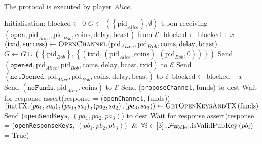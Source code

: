 \ \\  The protocol is executed by player $Alice$.
  \label{alg:lightningprot}
  \begin{algorithmic}[1]
    \State Initialisation:
    \Indent
      \State $\mathrm{blocked} \leftarrow 0$
      \State $G \leftarrow \left(\left\{\mathrm{pid}_{Alice}\right\}, \emptyset\right)$
    \EndIndent
    \State
    \State Upon receiving $\left(\mathtt{open}, \mathrm{pid}_{Alice}, \mathrm{pid}_{Bob},
    \mathrm{coins}, \mathrm{delay}, \mathrm{bcast}\right)$ from $\mathcal{E}$:
    \Indent
        \State $\mathrm{blocked} \leftarrow \mathrm{blocked} + x$
        \State $\left(\mathrm{txid}, \mathrm{success}\right) \gets
        \textsc{OpenChannel}\left(\mathrm{pid}_{Alice}, \mathrm{pid}_{Bob},
        \mathrm{coins}, \mathrm{delay}, \mathrm{bcast}\right)$
          \State $G \leftarrow G \cup \left(\left\{\mathrm{pid}_{Bob}\right\},
          \left\{\left(\mathrm{txid}, \left(\mathrm{pid}_{Alice}, \mathrm{coins}\right),
          \left(\mathrm{pid}_{Bob}, 0\right)\right)\right\}\right)$
          \State Send $\left(\mathtt{opened}, \mathrm{pid}_{Alice}, \mathrm{pid}_{Bob},
          \mathrm{coins}, \mathrm{delay}, \mathrm{bcast}, \mathrm{txid}\right)$ to
          $\mathcal{E}$
        \Else
          \State Send $\left(\mathtt{notOpened}, \mathrm{pid}_{Alice}, \mathrm{pid}_{Bob},
          \mathrm{coins}, \mathrm{delay}, \mathrm{bcast}\right)$ to $\mathcal{E}$
        \EndIf
        \State $\mathrm{blocked} \leftarrow \mathrm{blocked} - x$
      \Else
        \State Send $\left(\mathtt{noFunds}, \mathrm{pid}_{Alice}, \mathrm{coins}\right)$
        to $\mathcal{E}$
      \EndIf
    \EndIndent
    \State
      \State Send (\texttt{proposeChannel}, funds) to dest
      \State Wait for response
      \State assert(response = (\texttt{openChannel}, funds))
      \State $\left(\mathrm{initTX}, \left(pa_0, sa_0\right), \left(pa_1, sa_1\right),
      \left(pa_2, sa_2\right), \left(pa_3, sa_3\right)\right) \gets
      \textsc{GetOpenKeysAndTX}\left(\mathrm{funds}\right)$
      \State Send (\texttt{openSendKeys}, $\left(pa_1, pa_2, pa_3\right)$) to dest
      \State Wait for response
      \State assert(response = (\texttt{openResponseKeys}, $\left(pb_1, pb_2,
      pb_3\right)$)
      \Indent
        \State $\And \forall i \in \left[3\right],
        \mathcal{F}_{\mathrm{Wallet}}.\mathrm{isValidPubKey}\left(pb_i\right)$ = True)

\end{algorithmic}
